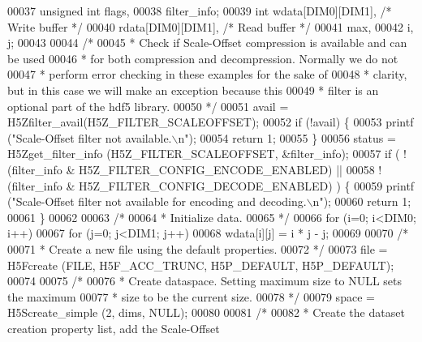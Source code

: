 \begin{DoxyCode}
00037     \textcolor{keywordtype}{unsigned} \textcolor{keywordtype}{int}    flags,
00038                     filter\_info;
00039     \textcolor{keywordtype}{int}             wdata[DIM0][DIM1],          \textcolor{comment}{/* Write buffer */}
00040                     rdata[DIM0][DIM1],          \textcolor{comment}{/* Read buffer */}
00041                     max,
00042                     i, j;
00043 
00044     \textcolor{comment}{/*}
00045 \textcolor{comment}{     * Check if Scale-Offset compression is available and can be used}
00046 \textcolor{comment}{     * for both compression and decompression.  Normally we do not}
00047 \textcolor{comment}{     * perform error checking in these examples for the sake of}
00048 \textcolor{comment}{     * clarity, but in this case we will make an exception because this}
00049 \textcolor{comment}{     * filter is an optional part of the hdf5 library.}
00050 \textcolor{comment}{     */}
00051     avail = H5Zfilter\_avail(H5Z\_FILTER\_SCALEOFFSET);
00052     \textcolor{keywordflow}{if} (!avail) \{
00053         printf (\textcolor{stringliteral}{"Scale-Offset filter not available.\(\backslash\)n"});
00054         \textcolor{keywordflow}{return} 1;
00055     \}
00056     status = H5Zget\_filter\_info (H5Z\_FILTER\_SCALEOFFSET, &filter\_info);
00057     \textcolor{keywordflow}{if} ( !(filter\_info & H5Z\_FILTER\_CONFIG\_ENCODE\_ENABLED) ||
00058                 !(filter\_info & H5Z\_FILTER\_CONFIG\_DECODE\_ENABLED) ) \{
00059         printf (\textcolor{stringliteral}{"Scale-Offset filter not available for encoding and decoding.\(\backslash\)n"});
00060         \textcolor{keywordflow}{return} 1;
00061     \}
00062 
00063     \textcolor{comment}{/*}
00064 \textcolor{comment}{     * Initialize data.}
00065 \textcolor{comment}{     */}
00066     \textcolor{keywordflow}{for} (i=0; i<DIM0; i++)
00067         \textcolor{keywordflow}{for} (j=0; j<DIM1; j++)
00068             wdata[i][j] = i * j - j;
00069 
00070     \textcolor{comment}{/*}
00071 \textcolor{comment}{     * Create a new file using the default properties.}
00072 \textcolor{comment}{     */}
00073     file = H5Fcreate (FILE, H5F\_ACC\_TRUNC, H5P\_DEFAULT, H5P\_DEFAULT);
00074 
00075     \textcolor{comment}{/*}
00076 \textcolor{comment}{     * Create dataspace.  Setting maximum size to NULL sets the maximum}
00077 \textcolor{comment}{     * size to be the current size.}
00078 \textcolor{comment}{     */}
00079     space = H5Screate\_simple (2, dims, NULL);
00080 
00081     \textcolor{comment}{/*}
00082 \textcolor{comment}{     * Create the dataset creation property list, add the Scale-Offset}

\end{DoxyCode}
